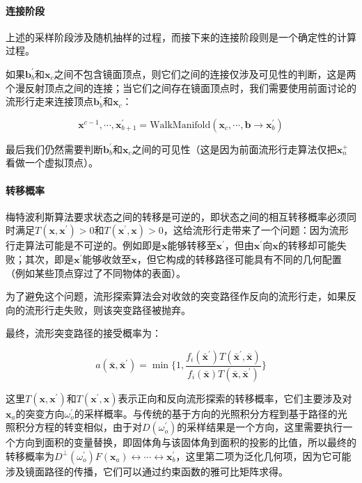 \paragraph{连接阶段}
上述的采样阶段涉及随机抽样的过程，而接下来的连接阶段则是一个确定性的计算过程。

如果$\mathbf{b}^{'}_b$和$\mathbf{x}_c$之间不包含镜面顶点，则它们之间的连接仅涉及可见性的判断，这是两个漫反射顶点之间的连接；当它们之间存在镜面顶点时，我们需要使用前面讨论的流形行走来连接顶点$\mathbf{b}^{'}_b$和$\mathbf{x}_c$：

\begin{equation}
	\mathbf{x}^{c-1},\cdots,\mathbf{x}^{'}_{b+1}=\text{WalkManifold}(\mathbf{x}_c,\cdots,\mathbf{b}\to\mathbf{x}^{'}_b)
\end{equation}

\noindent 最后我们仍然需要判断$\mathbf{b}^{'}_b$和$\mathbf{x}_c$之间的可见性（这是因为前面流形行走算法仅把$\mathbf{x}^{+}_n$看做一个虚拟顶点）。



\paragraph{转移概率}
梅特波利斯算法要求状态之间的转移是可逆的，即状态之间的相互转移概率必须同时满足$T(\mathbf{x},\mathbf{x}^{'})>0$和$T(\mathbf{x}^{'},\mathbf{x})>0$，这给流形行走带来了一个问题：因为流形行走算法可能是不可逆的。例如即是$\mathbf{x}$能够转移至$\mathbf{x}^{'}$，但由$\mathbf{x}^{'}$向$\mathbf{x}$的转移却可能失败；其次，即是$\mathbf{x}^{'}$能够收敛至$\mathbf{x}$，但它构成的转移路径可能具有不同的几何配置（例如某些顶点穿过了不同物体的表面）。

为了避免这个问题，流形探索算法会对收敛的突变路径作反向的流形行走，如果反向的流形行走失败，则该突变路径被抛弃。

最终，流形突变路径的接受概率为：

\begin{equation}
	a(\bar{\mathbf{x}},\bar{\mathbf{x}}^{'})=\min\bigg\{1,\frac{f_i(\bar{\mathbf{x}}^{'})T(\bar{\mathbf{x}}^{'},\bar{\mathbf{x}})}{f_i(\bar{\mathbf{x}})T(\bar{\mathbf{x}},\bar{\mathbf{x}}^{'})}\bigg\}
\end{equation}

\noindent 这里$T(\mathbf{x},\mathbf{x}^{'})$和$T(\mathbf{x}^{'},\mathbf{x})$表示正向和反向流形探索的转移概率，它们主要涉及对$\mathbf{x}_a$的突变方向$\omega^{'}_o$的采样概率。与传统的基于方向的光照积分方程到基于路径的光照积分方程的转变相似，由于对$D(\omega^{'}_o)$的采样结果是一个方向，这里需要执行一个方向到面积的变量替换，即固体角与该固体角到面积的投影的比值，所以最终的转移概率为$D^{\perp}(\omega^{'}_o)F(\mathbf{x}_a)\leftrightarrow\cdots\leftrightarrow\mathbf{x}^{'}_b$，这里第二项为泛化几何项，因为它可能涉及镜面路径的传播，它们可以通过约束函数的雅可比矩阵求得。





